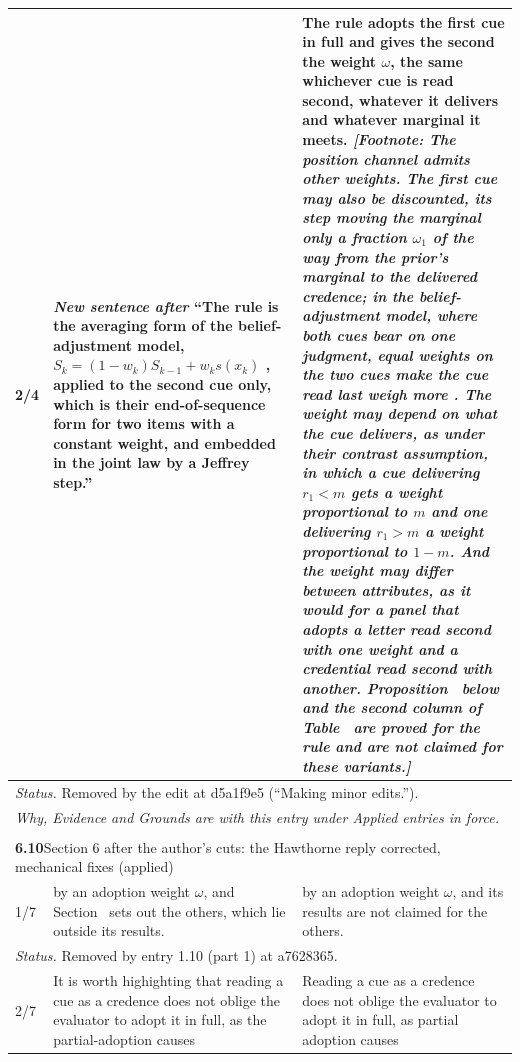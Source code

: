 \documentclass[10pt]{article}
\theoremstyle{definition}
\renewcommand{\ref}[1]{\textsc{\detokenize{#1}}}
\renewcommand{\footnote}[1]{ \textit{[Footnote: #1]}}
\newlength{\fullw}\setlength{\fullw}{25.9cm}
\newcommand{\entryhead}[2]{\multicolumn{3}{|l|}{\rule{0pt}{2.6ex}\large\textbf{#1}\quad #2} \\ \hline}
\begin{document}
{\begin{longtable}{|p{0.9cm}|p{12.2cm}|p{12.2cm}|}
2/4 & \textit{New sentence after} ``The rule is the averaging form of the belief-adjustment model, $S_k=(1-w_k)S_{k-1}+w_k s(x_k)$ \citep[Eq.~4]{HogarthEinhorn1992}, applied to the second cue only, which is their end-of-sequence form for two items with a constant weight, and embedded in the joint law by a Jeffrey step.'' & The rule adopts the first cue in full and gives the second the weight $\omega$, the same whichever cue is read second, whatever it delivers and whatever marginal it meets.\footnote{The position channel admits other weights. The first cue may also be discounted, its step moving the marginal only a fraction $\omega_1$ of the way from the prior's marginal to the delivered credence; in the belief-adjustment model, where both cues bear on one judgment, equal weights on the two cues make the cue read last weigh more \citep[Appendix~B]{HogarthEinhorn1992}. The weight may depend on what the cue delivers, as under their contrast assumption, in which a cue delivering $r_1<m$ gets a weight proportional to $m$ and one delivering $r_1>m$ a weight proportional to $1-m$. And the weight may differ between attributes, as it would for a panel that adopts a letter read second with one weight and a credential read second with another. Proposition~\ref{prop:LAD} below and the second column of Table~\ref{tab:cases} are proved for the rule and are not claimed for these variants.} \\ \hline
\multicolumn{3}{|p{\fullw}|}{\textit{Status.} Removed by the edit at d5a1f9e5 (``Making minor edits.'').} \\ \hline
\multicolumn{3}{|p{\fullw}|}{\textit{Why, Evidence and Grounds are with this entry under Applied entries in force.}} \\ \hline
\multicolumn{3}{|l|}{} \\ \hline
\entryhead{6.10}{Section 6 after the author's cuts: the Hawthorne reply corrected, mechanical fixes (applied)\quad{\footnotesize\textit{(formerly C.29)}}}
1/7 & by an adoption weight $\omega$, and Section~\ref{sec:scope} sets out the others, which lie outside its results. & by an adoption weight $\omega$, and its results are not claimed for the others. \\ \hline
\multicolumn{3}{|p{\fullw}|}{\textit{Status.} Removed by entry 1.10 (part 1) at a7628365.} \\ \hline
2/7 & It is worth highighting that reading a cue as a credence does not oblige the evaluator to adopt it in full, as the partial-adoption causes & Reading a cue as a credence does not oblige the evaluator to adopt it in full, as partial adoption causes \\ \hline

\end{longtable}}
\end{document}
